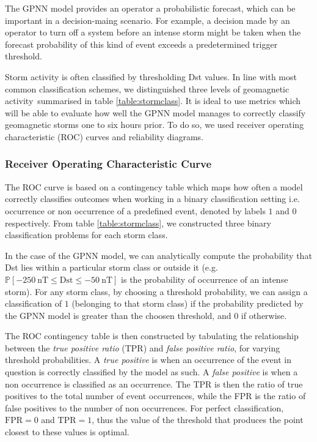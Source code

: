The GPNN model provides an operator a probabilistic forecast, which can be important in a decision-maing scenario. 
For example, a decision made by an operator to turn off a system before an intense storm might be taken 
when the forecast probability of this kind of event exceeds a predetermined trigger threshold.

Storm activity is often classified by thresholding Dst values. In line with most common classification schemes, 
we distinguished three levels of geomagnetic activity summarised in table \ref{table:stormclass}. It is ideal to 
use metrics which will be able to evaluate how well the GPNN model manages to correctly classify geomagnetic 
storms one to six hours prior. To do so, we used receiver operating characteristic (ROC) curves and 
reliability diagrams.



\subsubsection{Receiver Operating Characteristic Curve}

The ROC curve is based on a contingency table which maps how often a model correctly classifies outcomes when 
working in a binary classification setting i.e. occurrence or non occurrence of a predefined event, denoted by labels 
$1$ and $0$ respectively. From table \ref{table:stormclass}, we constructed three binary classification problems for each 
storm class.

In the case of the GPNN model, we can analytically compute the probability that Dst lies within a particular storm class 
or outside it (e.g. $\mathbb{P}[\SI{-250}{\nano\tesla} \leq \mathrm{Dst} \leq \SI{-50}{\nano\tesla}]$ is the probability 
of occurrence of an intense storm). For any storm class, by choosing a threshold probability, we can assign a classification 
of $1$ (belonging to that storm class) if the probability predicted by the GPNN model is greater than the choosen threshold, 
and $0$ if otherwise. 

The ROC contingency table is then constructed by tabulating the relationship between the \emph{true positive ratio} (TPR) and 
\emph{false positive ratio}, for varying threshold probabilities. A \emph{true positive} is when an occurrence of the event in 
question is correctly classified by the model as such. A \emph{false positive} is when a non occurrence is classified as an 
occurrence. The TPR is then the ratio of true positives to the total number of event occurrences, while the FPR is the ratio of 
false positives to the number of non occurrences. For perfect classification, $\mathrm{FPR} = 0$ and $\mathrm{TPR} = 1$, thus 
the value of the threshold that produces the point closest to these values is optimal.  

